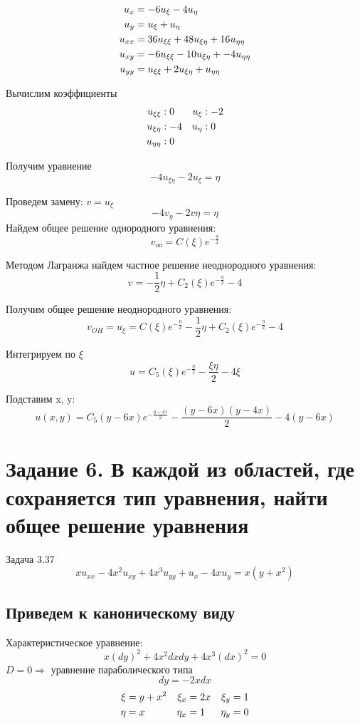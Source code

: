 \documentclass[a4paper,12pt]{article}
\begin{document}
\begin{align}
    u_x &= -6u_\xi - 4u_\eta \notag \\
    u_y &= u_\xi + u_\eta \notag \\
    u_{xx} &= 36u_{\xi\xi} + 48u_{\xi\eta} + 16u_{\eta\eta} \notag \\
    u_{xy} &= -6u_{\xi\xi} - 10u_{\xi\eta} + -4u_{\eta\eta} \notag \\
    u_{yy} &= u_{\xi\xi} + 2u_{\xi\eta} + u_{\eta\eta} \notag
\end{align}

Вычислим коэффициенты
\begin{align}
u_{\xi\xi} &: 0 &u_\xi &: -2 \notag \\
u_{\xi\eta} &: -4 &u_\eta &: 0 \notag \\
u_{\eta\eta} &: 0 \notag
\end{align}

Получим уравнение
$$-4u_{\xi\eta} - 2u_\xi = \eta$$

Проведем замену:
$v = u_\xi$
$$-4v_\eta - 2v \eta = \eta$$
Найдем общее решение однородного уравнения:
$$v_{oo} = C(\xi)e^{-\frac{\eta}{2}}$$

Методом Лагранжа найдем частное решение неоднородного уравнения:
$$v = -\frac{1}{2}\eta + C_2(\xi)e^{-\frac{\eta}{2}} - 4$$

Получим общее решение неоднородного уравнения:
$$v_{OH} = u_\xi = C(\xi)e^{-\frac{\eta}{2}} -\frac{1}{2}\eta + C_2(\xi)e^{-\frac{\eta}{2}} - 4$$

Интегрируем по $\xi$
$$u = C_5(\xi)e^{-\frac{\eta}{2}} - \frac{\xi\eta}{2} - 4\xi$$

Подставим x, y:
$$u(x,y) = C_5(y-6x)e^{-\frac{y-4x}{2}} - \frac{(y-6x)(y-4x)}{2} - 4(y-6x)$$

\section{Задание 6. В каждой из областей, где сохраняется тип уравнения, найти общее решение уравнения}
Задача 3.37
$$xu_{xx} - 4x^2u_{xy} + 4x^3u_{yy} + u_x - 4xu_y = x(y+x^2)$$

\subsection{Приведем к каноническому виду}
    Характеристическое уравнение:
    $$x(dy)^2 + 4x^2dxdy + 4x^3(dx)^2 = 0$$
    $D = 0 \Rightarrow$ уравнение параболического типа
    $$dy = -2xdx$$
    \begin{align}
        \xi &= y+x^2 &\xi_x &= 2x &\xi_y &= 1 \notag \\
        \eta &= x &\eta_x &= 1 &\eta_y &= 0 \notag  
    \end{align}
\end{document}
